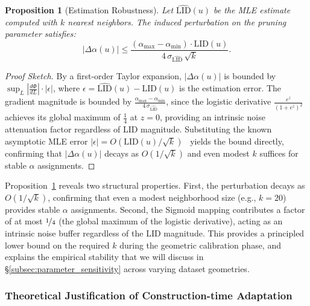 \documentclass{article}
\theoremstyle{plain}
\newtheorem{proposition}[theorem]{Proposition}
\theoremstyle{definition}
\theoremstyle{remark}
\begin{document}
\begin{proposition}[Estimation Robustness]
\label{prop:robustness}
Let $\widehat{\mathrm{LID}}(u)$ be the MLE estimate computed with
$k$ nearest neighbors. The induced perturbation on the pruning
parameter satisfies:
\begin{equation}
    |\Delta\alpha(u)| \leq
    \frac{(\alpha_{\max} - \alpha_{\min}) \cdot \mathrm{LID}(u)}
         {4\,\sigma_{\widehat{\mathrm{LID}}}\,\sqrt{k}}.
    \label{eq:robustness_bound}
\end{equation}
\end{proposition}

\begin{proof}[Proof Sketch]
By a first-order Taylor expansion, $|\Delta\alpha(u)|$ is bounded by $\sup_L \left|\frac{d\Phi}{dL}\right| \cdot |\epsilon|$, where $\epsilon = \widehat{\mathrm{LID}}(u) - \mathrm{LID}(u)$ is the estimation error.
The gradient magnitude is bounded by $\frac{\alpha_{\max}-\alpha_{\min}}{4\,\sigma_{\widehat{\mathrm{LID}}}}$, since the logistic derivative $\frac{e^z}{(1+e^z)^2}$ achieves its global maximum of $\frac{1}{4}$ at $z=0$, providing an intrinsic noise attenuation factor regardless of LID magnitude.
Substituting the known asymptotic MLE error $|\epsilon| = O\!\left(\mathrm{LID}(u)/\sqrt{k}\right)$~\cite{NIPS2004_74934548} yields the bound directly, confirming that $|\Delta\alpha(u)|$ decays as $O(1/\sqrt{k})$ and even modest $k$ suffices for stable $\alpha$ assignments.
\end{proof}

Proposition~\ref{prop:robustness} reveals two structural properties.
First, the perturbation decays as $O(1/\sqrt{k})$, confirming that
even a modest neighborhood size (e.g., $k = 20$) provides stable
$\alpha$ assignments. Second, the Sigmoid mapping contributes a
factor of at most $\nicefrac{1}{4}$ (the global maximum of the
logistic derivative), acting as an intrinsic noise buffer regardless
of the LID magnitude. This provides a principled lower bound on the
required $k$ during the geometric calibration phase, and explains
the empirical stability that we will discuss in \S\ref{subsec:parameter_sensitivity}
across varying dataset geometries.

\subsubsection{Theoretical Justification of Construction-time Adaptation}
\label{subsec:optimality}
\end{document}
